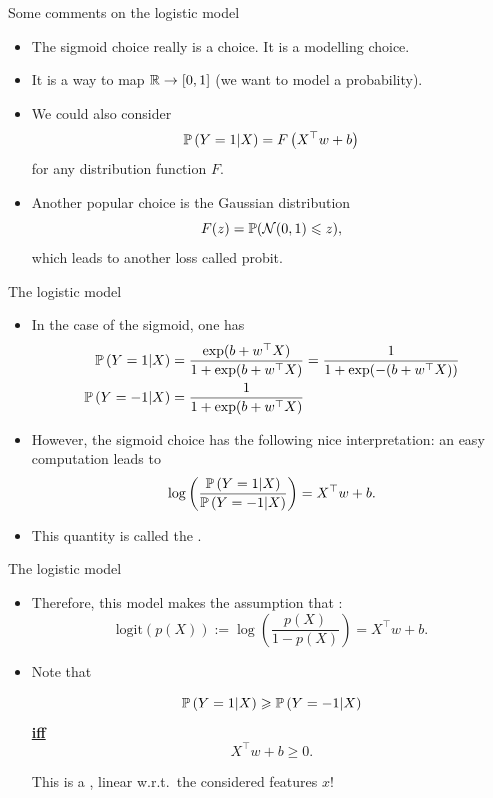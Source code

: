 \documentclass[xcolor={usenames,dvipsnames},handout]{beamer}
\begin{document}
\begin{frame}{Some comments on the logistic model}
\begin{itemize}
\item The sigmoid choice really is a choice. It is a modelling choice.
\item It is a way to map $\R \to [0, 1]$ (we want to model a probability).
\item We could also consider
$$
\P\left(  Y = 1 | X \right) = F \left( X^\top w +b \right)
$$
for any distribution function $F$. 
\pause
\item Another popular choice is the
Gaussian distribution
$$ F(z) = \P(\Nc(0,1) \leq  z),
$$
which leads to another loss called {\color{PineGreen}probit}.
\end{itemize}
\end{frame}

\begin{frame}{The logistic model}

\begin{itemize}
\item In the case of the sigmoid,
one has
\begin{align*}
\P\left(  Y = 1 | X  \right) &= \frac{\exp (b+ w^\top X)}{1+ \exp(b+ w^\top X)} = \frac{1}{1+\exp(-(b+ w^\top X)) } \\
\P\left(  Y = - 1 | X \right) &=  \frac{1}{1+\exp(b+ w^\top X) }
\end{align*}

\item However, the sigmoid choice has the following nice interpretation: an easy computation leads to
$$
\log \left( \frac{\P\left(  Y = 1 | X  \right)}{\P\left(  Y = -1 | X \right)} \right) = X^\top w +b.
$$
\item This quantity is called the .
\end{itemize}
\end{frame}

\begin{frame}{The logistic model}

\begin{itemize}
\item Therefore, this model makes the assumption that :
$$
\mathrm{logit} (p(X)) := \log\left( \frac{p(X)}{1-p(X)} \right) = X^\top w + b.
$$
\pause
\item Note that 
\begin{block}{}
$$
\P\left(  Y = 1 | X  \right) \geq \P\left(  Y = -1 | X  \right)
$$
\underline{\textbf{iff}}
$$
X^\top w + b \geq 0.
$$
\end{block}
\pause
This is a , linear w.r.t.\ the considered features $x$!
\end{itemize}
\end{frame}
\end{document}
